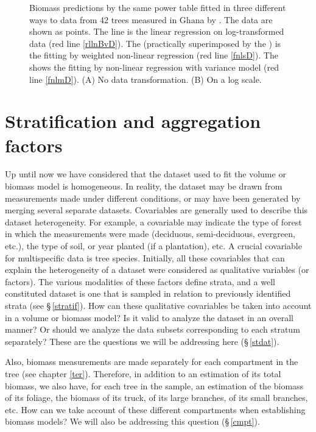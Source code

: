 \begin{figure}[htb]
\begin{center}
\end{center}
\caption[Biomass predictions by the same power table fitted in three different ways to data from 42 trees measured in Ghana by \citet{henry10}]{Biomass predictions by the same power table fitted in three different ways to data from 42 trees measured in Ghana by \citet{henry10}. The data are shown as points. The  line is the linear regression on log-transformed data (red line \ref{rllnBvD}). The  (practically superimposed by the ) is the fitting by weighted non-linear regression (red line \ref{fnlsD}). The  shows the fitting by non-linear regression with variance model (red line \ref{fnlmD}). (A) No data transformation. (B) On a log scale.\label{fselm}}
\end{figure}%

\section{Stratification and aggregation factors}

Up until now we have considered that the dataset used to fit the volume or biomass model is homogeneous. In reality, the dataset may be drawn from measurements made under different conditions, or may have been generated by merging several separate datasets. Covariables are generally used to describe this dataset heterogeneity. For example, a covariable may indicate the type of forest in which the measurements were made (deciduous, semi-deciduous, evergreen, etc.), the type of soil, or year planted (if a plantation), etc. A crucial covariable for multispecific data is tree species. Initially, all these covariables that can explain the heterogeneity of a dataset were considered as qualitative variables (or factors). The various modalities of these factors define strata, and a well constituted dataset is one that is sampled in relation to previously identified strata (see \S\,\ref{stratif}). How can these qualitative covariables be taken into account in a volume or biomass model? Is it valid to analyze the dataset in an overall manner? Or should we analyze the data subsets corresponding to each stratum separately? These are the questions we will be addressing here (\S\,\ref{stdat}).

Also, biomass measurements are made separately for each compartment in the tree (see chapter \ref{ter}). Therefore, in addition to an estimation of its total biomass, we also have, for each tree in the sample, an estimation of the biomass of its foliage, the biomass of its truck, of its large branches, of its small branches, etc. How can we take account of these different compartments when establishing biomass models? We will also be addressing this question (\S\,\ref{cmpt}).

